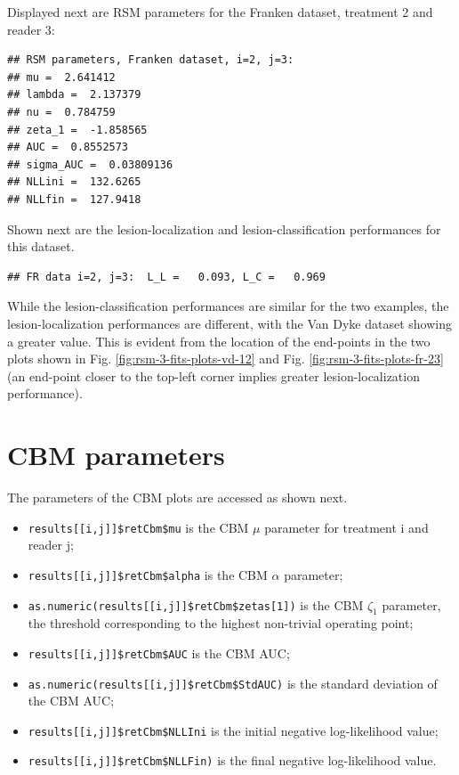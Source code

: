 \documentclass[
]{book}
\providecommand{\tightlist}{%
  \setlength{\itemsep}{0pt}\setlength{\parskip}{0pt}}
\begin{document}
Displayed next are RSM parameters for the Franken dataset, treatment 2 and reader 3:

\begin{verbatim}
## RSM parameters, Franken dataset, i=2, j=3: 
## mu =  2.641412 
## lambda =  2.137379 
## nu =  0.784759 
## zeta_1 =  -1.858565 
## AUC =  0.8552573 
## sigma_AUC =  0.03809136 
## NLLini =  132.6265 
## NLLfin =  127.9418
\end{verbatim}

Shown next are the lesion-localization and lesion-classification performances for this dataset.

\begin{verbatim}
## FR data i=2, j=3:  L_L =   0.093, L_C =   0.969
\end{verbatim}

While the lesion-classification performances are similar for the two examples, the lesion-localization performances are different, with the Van Dyke dataset showing a greater value. This is evident from the location of the end-points in the two plots shown in Fig. \ref{fig:rsm-3-fits-plots-vd-12} and Fig. \ref{fig:rsm-3-fits-plots-fr-23} (an end-point closer to the top-left corner implies greater lesion-localization performance).

\hypertarget{rsm-3-fits-cbm-parameters}{%
\section{CBM parameters}\label{rsm-3-fits-cbm-parameters}}

The parameters of the CBM plots are accessed as shown next.

\begin{itemize}
\tightlist
\item
  \texttt{results{[}{[}i,j{]}{]}\$retCbm\$mu} is the CBM \(\mu\) parameter for treatment i and reader j;
\item
  \texttt{results{[}{[}i,j{]}{]}\$retCbm\$alpha} is the CBM \(\alpha\) parameter;\\
\item
  \texttt{as.numeric(results{[}{[}i,j{]}{]}\$retCbm\$zetas{[}1{]})} is the CBM \(\zeta_1\) parameter, the threshold corresponding to the highest non-trivial operating point;
\item
  \texttt{results{[}{[}i,j{]}{]}\$retCbm\$AUC} is the CBM AUC;
\item
  \texttt{as.numeric(results{[}{[}i,j{]}{]}\$retCbm\$StdAUC)} is the standard deviation of the CBM AUC;
\item
  \texttt{results{[}{[}i,j{]}{]}\$retCbm\$NLLIni} is the initial negative log-likelihood value;
\item
  \texttt{results{[}{[}i,j{]}{]}\$retCbm\$NLLFin)} is the final negative log-likelihood value.
\end{itemize}
\end{document}
